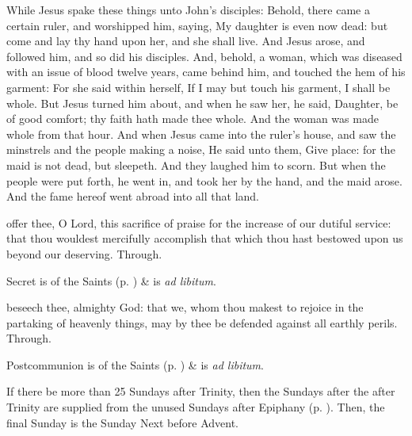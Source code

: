  While Jesus spake these things unto John's disciples: Behold, there came a certain ruler, and worshipped him, saying, My daughter is even now dead: but come and lay thy hand upon her, and she shall live. And Jesus arose, and followed him, and so did his disciples. And, behold, a woman, which was diseased with an issue of blood twelve years, came behind him, and touched the hem of his garment: For she said within herself, If I may but touch his garment, I shall be whole. But Jesus turned him about, and when he saw her, he said, Daughter, be of good comfort; thy faith hath made thee whole. And the woman was made whole from that hour. And when Jesus came into the ruler's house, and saw the minstrels and the people making a noise, He said unto them, Give place: for the maid is not dead, but sleepeth. And they laughed him to scorn. But when the people were put forth, he went in, and took her by the hand, and the maid arose. And the fame hereof went abroad into all that land.


\secret
{} offer thee, O Lord, this sacrifice of praise for the increase of our dutiful service: that thou wouldest mercifully accomplish that which thou hast bestowed upon us beyond our deserving. Through.
\begin{rubric}
     Secret is of the Saints (p. \pageref{SPSaints}) \&  is \emph{ad libitum}.
\end{rubric}


\postcommunion
{} beseech thee, almighty God: that we, whom thou makest to rejoice in the partaking of heavenly things, may by thee be defended against all earthly perils. Through.
\begin{rubric}
     Postcommunion is of the Saints (p. \pageref{SPSaints}) \&  is \emph{ad libitum}.
\end{rubric}

\begin{rubric}
    If there be more than 25 Sundays after Trinity, then the Sundays after the  after Trinity are supplied from the unused Sundays after Epiphany (p. \pageref{epiphany}). Then, the final Sunday is the Sunday Next before Advent.
\end{rubric}

